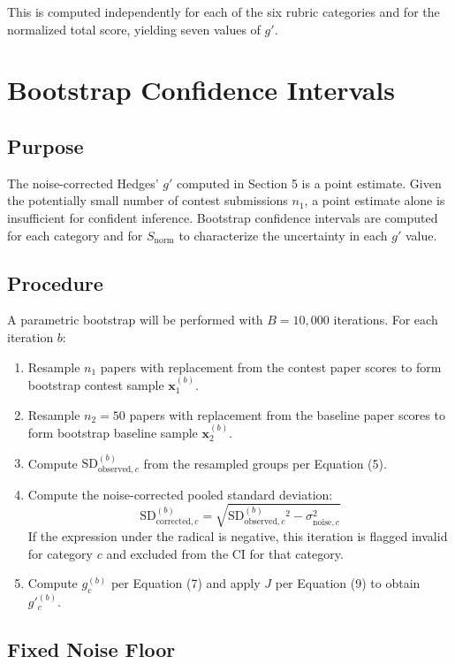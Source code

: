 \documentclass[11pt]{article}
\begin{document}
This is computed independently for each of the six rubric categories and for the normalized total score, yielding seven values of $g'$.

\section{Bootstrap Confidence Intervals}

\subsection{Purpose}

The noise-corrected Hedges' $g'$ computed in Section 5 is a point estimate. Given the potentially small number of contest submissions $n_1$, a point estimate alone is insufficient for confident inference. Bootstrap confidence intervals are computed for each category and for $S_{\text{norm}}$ to characterize the uncertainty in each $g'$ value.

\subsection{Procedure}

A parametric bootstrap will be performed with $B = 10{,}000$ iterations. For each iteration $b$:

\begin{enumerate}
    \item Resample $n_1$ papers with replacement from the contest paper scores to form bootstrap contest sample $\mathbf{x}^{(b)}_1$.
    \item Resample $n_2 = 50$ papers with replacement from the baseline paper scores to form bootstrap baseline sample $\mathbf{x}^{(b)}_2$.
    \item Compute $\text{SD}^{(b)}_{\text{observed},c}$ from the resampled groups per Equation (5).
    \item Compute the noise-corrected pooled standard deviation:
    \[
    \text{SD}^{(b)}_{\text{corrected},c} = \sqrt{\text{SD}^{(b)}_{\text{observed},c}{}^2 - \sigma^2_{\text{noise},c}}
    \]
    If the expression under the radical is negative, this iteration is flagged invalid for category $c$ and excluded from the CI for that category.
    \item Compute $g^{(b)}_c$ per Equation (7) and apply $J$ per Equation (9) to obtain $g'^{(b)}_c$.
\end{enumerate}

\subsection{Fixed Noise Floor}
\end{document}
